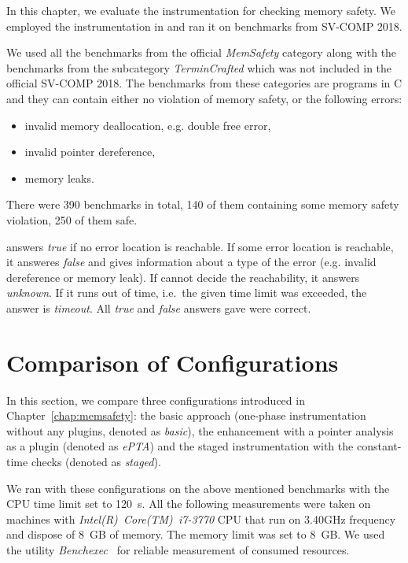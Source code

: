 In this chapter, we evaluate the instrumentation for checking memory safety.
We employed the instrumentation in \symbiotic and ran it on benchmarks from SV-COMP 2018.

We used all the benchmarks from the official \emph{MemSafety} category along
with the benchmarks from the subcategory \emph{TerminCrafted} which was not
included in the official SV-COMP 2018. The benchmarks from these categories are
programs in C and they can contain either no violation of memory safety, or the
following errors:
\begin{itemize}
  \item invalid memory deallocation, e.g. double free error,
  \item invalid pointer dereference,
  \item memory leaks.
\end{itemize}
There were 390 benchmarks in total, 140 of them containing some
memory safety violation, 250 of them safe.

\symbiotic answers \emph{true} if no error location is reachable. If some error
location is reachable, it answeres \emph{false} and gives information about a
type of the error (e.g.  invalid dereference or memory leak). If \symbiotic
cannot decide the reachability, it answers \emph{unknown}. If it runs out of
time, i.e.~the given time limit was exceeded, the answer is \emph{timeout}. All
\emph{true} and \emph{false} answers \symbiotic gave were correct.


\section{Comparison of Configurations}
In this section, we compare three configurations introduced in
Chapter~\ref{chap:memsafety}: the basic approach (one-phase instrumentation
without any plugins, denoted as \emph{basic}), the enhancement with a pointer
analysis as a plugin (denoted as \emph{ePTA}) and the staged instrumentation
with the constant-time checks (denoted as \emph{staged}).

We ran \symbiotic with these configurations on the above mentioned benchmarks
with the CPU time limit set to 120~s. All the following measurements were taken
on machines with \textit{Intel(R)~Core(TM)~i7-3770} CPU that run on 3.40GHz
frequency and dispose of 8~GB of memory. The memory limit was set to 8~GB. We
used the utility \emph{Benchexec}~\cite{Beyer2015} for reliable measurement of
consumed resources.

